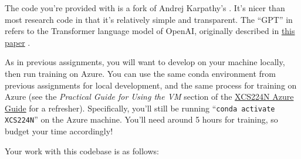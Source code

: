 
The code you're provided with is a fork of Andrej Karpathy's \href{https://github.com/karpathy/minGPT}{\mingpt}.
It's nicer than most research code in that it's relatively simple and transparent.
The ``GPT'' in \mingpt refers to the Transformer language model of OpenAI, originally described in \href{https://s3-us-west-2.amazonaws.com/openai-assets/research-covers/language-unsupervised/language_understanding_paper.pdf}{this paper} \cite{radford2018improving}.


As in previous assignments, you will want to develop on your machine locally, then run training on Azure. You can use the same conda environment from previous assignments for local development, and the same process for training on Azure (see the \textit{Practical Guide for Using the VM} section of the \href{https://docs.google.com/document/d/10J520Vnb1LnAMo0qgSYpG5cEEbomqQ371NIqg1IAv-4/edit?usp=sharing}{XCS224N Azure Guide} for a refresher). Specifically, you'll still be running ``\texttt{conda activate XCS224N}'' on the Azure machine. You'll need around 5 hours for training, so budget your time accordingly!

Your work with this codebase is as follows:

